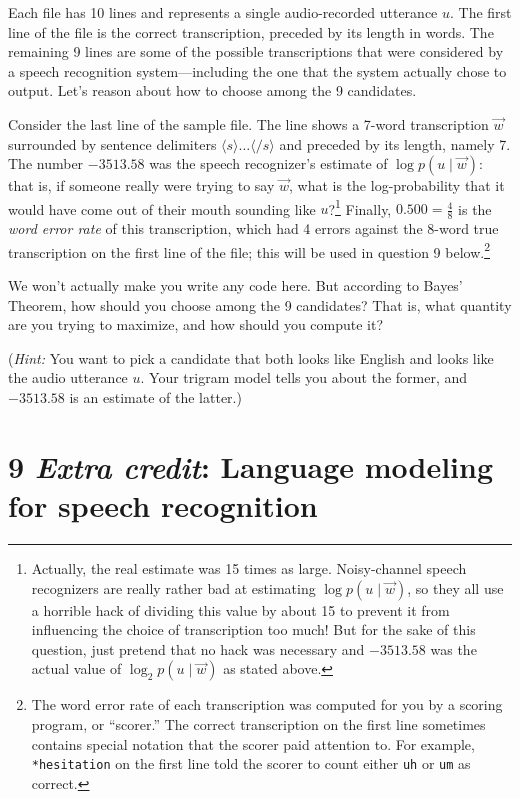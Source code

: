 \documentclass[12pt]{article}
\theoremstyle{plain}
\theoremstyle{definition}
\theoremstyle{remark}
\begin{document}
Each file has 10 lines and represents a single audio-recorded utterance $u$. The first line of the file is the correct transcription, preceded by its length in words. The remaining 9 lines are some of the possible transcriptions that were considered by a speech recognition system—including the one that the system actually chose to output. Let’s reason about how to choose among the 9 candidates.

Consider the last line of the sample file. The line shows a 7-word transcription $\vec{w}$ surrounded by sentence delimiters $\langle s \rangle \ldots \langle /s \rangle$ and preceded by its length, namely 7. The number $-3513.58$ was the speech recognizer’s estimate of $\log p(u \mid \vec{w})$: that is, if someone really were trying to say $\vec{w}$, what is the log-probability that it would have come out of their mouth sounding like $u$?\footnote{Actually, the real estimate was 15 times as large. Noisy-channel speech recognizers are really rather bad at estimating $\log p(u \mid \vec{w})$, so they all use a horrible hack of dividing this value by about 15 to prevent it from influencing the choice of transcription too much! But for the sake of this question, just pretend that no hack was necessary and $-3513.58$ was the actual value of $\log_2 p(u \mid \vec{w})$ as stated above.} Finally, $0.500 = \tfrac{4}{8}$ is the \textit{word error rate} of this transcription, which had 4 errors against the 8-word true transcription on the first line of the file; this will be used in question 9 below.\footnote{The word error rate of each transcription was computed for you by a scoring program, or ``scorer.'' The correct transcription on the first line sometimes contains special notation that the scorer paid attention to. For example, \texttt{*hesitation} on the first line told the scorer to count either \texttt{uh} or \texttt{um} as correct.}

We won’t actually make you write any code here. But according to Bayes’ Theorem, how should you choose among the 9 candidates? That is, what quantity are you trying to maximize, and how should you compute it?

(\textit{Hint:} You want to pick a candidate that both looks like English and looks like the audio utterance $u$. Your trigram model tells you about the former, and $-3513.58$ is an estimate of the latter.)

\section*{9 \textit{Extra credit}: Language modeling for speech recognition}
\end{document}
